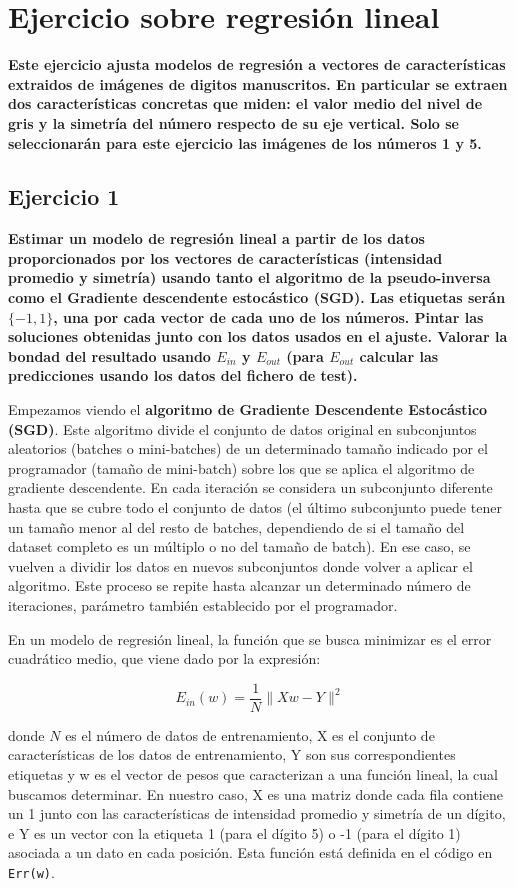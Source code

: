\documentclass[a4]{article}
\begin{document}
\section{Ejercicio sobre regresión lineal}
\textbf{Este ejercicio ajusta modelos de regresión a vectores de características extraidos de imágenes
de digitos manuscritos. En particular se extraen dos características concretas que miden: el valor
medio del nivel de gris y la simetría del número respecto de su eje vertical. Solo se seleccionarán
para este ejercicio las imágenes de los números 1 y 5.
}
\subsection{Ejercicio 1}
\textbf{Estimar un modelo de regresión lineal a partir de los datos proporcionados por
los vectores de características (intensidad promedio y simetría) usando tanto el algoritmo
de la pseudo-inversa como el Gradiente descendente estocástico (SGD). Las etiquetas serán
$\{-1, 1\}$, una por cada vector de cada uno de los números. Pintar las soluciones obtenidas
junto con los datos usados en el ajuste. Valorar la bondad del resultado usando $E_{in}$ y
$E_{out}$ (para $E_{out}$ calcular las predicciones usando los datos del fichero de test).
}

Empezamos viendo el \textbf{algoritmo de Gradiente Descendente Estocástico (SGD)}. 
Este algoritmo divide el conjunto de datos original en subconjuntos aleatorios (batches o mini-batches) de un determinado tamaño indicado por el programador (tamaño de mini-batch) sobre los que se aplica el algoritmo de gradiente descendente. En cada iteración se considera un subconjunto diferente hasta que se cubre todo el conjunto de datos (el último subconjunto puede tener un tamaño menor al del resto de batches, dependiendo de si el tamaño del dataset completo es un múltiplo o no del tamaño de batch). En ese caso, se vuelven a dividir los datos en nuevos subconjuntos donde volver a aplicar el algoritmo. Este proceso se repite hasta alcanzar un determinado número de iteraciones, parámetro también establecido por el programador. 

En un modelo de regresión lineal, la función que se busca minimizar es el error cuadrático medio, que viene dado por la expresión:

$$ E_{in}(w)=\frac{1}{N}\|Xw-Y\|^2$$

donde $N$ es el número de datos de entrenamiento, X es el conjunto de características de los datos de entrenamiento, Y son sus correspondientes etiquetas y w es el vector de pesos que caracterizan a una función lineal, la cual buscamos determinar. En nuestro caso, X es una matriz donde cada fila contiene un 1 junto con las características de intensidad promedio y simetría de un dígito, e Y es un vector con la etiqueta 1 (para el dígito 5) o -1 (para el dígito 1) asociada a un dato en cada posición. Esta función está definida en el código en \lstinline|Err(w)|.
\end{document}
